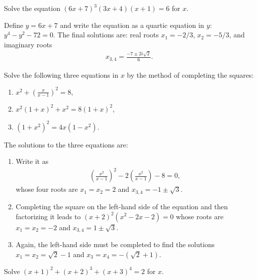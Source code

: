 \begin{question}
    Solve the equation $(6x+7)^3(3x+4)(x+1)=6$ for $x$.
\end{question}

\begin{solution}
    Define $y=6x+7$ and write the equation as a quartic equation in $y$: $y^4-y^2-72=0$. The final solutions are: real roots $x_1=-2/3$, $x_2=-5/3$, and imaginary roots
    \begin{align*}
        x_{3,4}=\frac{-7\pm 2i\sqrt{2}}{6}.
    \end{align*}
\end{solution}


\begin{question}[name={Quartic Equations \& Completing the Squares}]
    Solve the following three equations in $x$ by the method of completing the squares:
    \begin{enumerate}
        \item $\displaystyle x^2 + \left(\frac{x}{x-1}\right)^2 = 8$,
        \item $x^2(1+x)^2 + x^2 = 8(1+x)^2$,
        \item $(1+x^2)^2 = 4x(1-x^2)$.
    \end{enumerate}
\end{question}

\begin{solution}
    The solutions to the three equations are:
    \begin{enumerate}
        \item Write it as 
        \begin{align*}
            \left(\frac{x^2}{x-1}\right)^2-2\left(\frac{x^2}{x-1}\right)-8=0,
        \end{align*}
        whose four roots are $x_1=x_2=2$ and $x_{3,4}=-1\pm \sqrt{3}$.
        \item Completing the square on the left-hand side of the equation and then factorizing it leads to $(x+2)^2(x^2-2x-2)=0$ whose roots are $x_1=x_2=-2$ and $x_{3,4}=1\pm \sqrt{3}$.
        \item Again, the left-hand side must be completed to find the solutions $x_1=x_2=\sqrt 2 - 1$ and $x_3=x_4=-(\sqrt 2 + 1)$.
    \end{enumerate}
\end{solution}


\begin{question}
    Solve $(x+1)^2+(x+2)^3+(x+3)^4=2$ for $x$.
\end{question}

